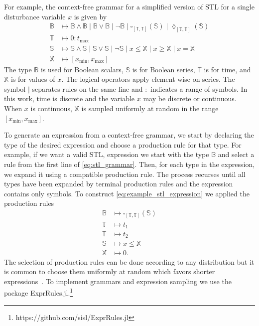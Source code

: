 For example, the context-free grammar for a simplified version of STL for a single disturbance variable $x$ is given by
\begin{equation}
\label{eq:stl_grammar}
\begin{split}
    \mathbb{B} &\mapsto \mathbb{B} \land \mathbb{B} \mid \mathbb{B} \lor \mathbb{B} \mid \neg \mathbb{B} \mid \square_{[\mathbb{T},\mathbb{T}]}(\mathbb{S}) \mid \lozenge_{[\mathbb{T},\mathbb{T}]}(\mathbb{S}) \\
    \mathbb{T} &\mapsto 0:t_{\max} \\
    \mathbb{S} &\mapsto \mathbb{S} \land \mathbb{S} \mid \mathbb{S} \lor \mathbb{S} \mid \neg \mathbb{S} \mid x \leq \mathbb{X} \mid x \geq \mathbb{X} \mid x = \mathbb{X} \\
    \mathbb{X} &\mapsto [x_{\min},x_{\max}]
\end{split}
\end{equation}
The type $\mathbb{B}$ is used for Boolean scalars, $\mathbb{S}$ is for Boolean series, $\mathbb{T}$ is for time, and $\mathbb{X}$ is for values of $x$. The logical operators apply element-wise on series. The symbol $\mid$ separates rules on the same line and $:$ indicates a range of symbols. In this work, time is discrete and the variable $x$ may be discrete or continuous. When $x$ is continuous, $\mathbb{X}$ is sampled uniformly at random in the range $[x_{\min}, x_{\max}]$.

To generate an expression from a context-free grammar, we start by declaring the type of the desired expression and choose a production rule for that type. For example, if we want a valid STL, expression we start with the type $\mathbb{B}$ and select a rule from the first line of \cref{eq:stl_grammar}. Then, for each type in the expression, we expand it using a compatible production rule. The process recurses until all types have been expanded by terminal production rules and the expression contains only symbols. To construct \cref{eq:example_stl_expression} we applied the production rules
\begin{align}
    \mathbb{B} &\mapsto \square_{[\mathbb{T},\mathbb{T}]}(\mathbb{S}) \\
    \mathbb{T} &\mapsto t_1 \\
    \mathbb{T} &\mapsto t_2 \\
    \mathbb{S} &\mapsto x \leq \mathbb{X} \\
    \mathbb{X} &\mapsto 0 \text{.}
\end{align}
The selection of production rules can be done according to any distribution but it is common to choose them uniformly at random which favors shorter expressions~\cite{kochenderfer2019algorithms}. To implement grammars and expression sampling we use the package ExprRules.jl.\footnote{https://github.com/sisl/ExprRules.jl}


